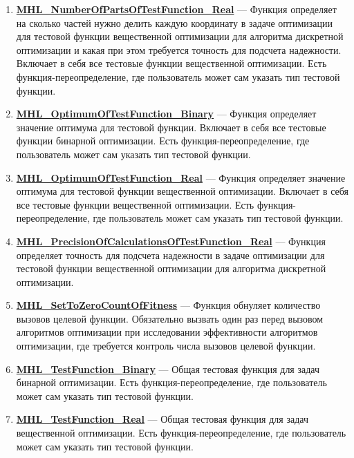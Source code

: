 \documentclass[a4paper,12pt]{article}
\begin{document}
\begin{enumerate}
\item \textbf{\hyperref[MHL_NumberOfPartsOfTestFunction_Real]{MHL\_NumberOfPartsOfTestFunction\_Real}} --- Функция определяет на сколько частей нужно делить каждую координату в задаче оптимизации для тестовой функции вещественной оптимизации для алгоритма дискретной оптимизации и какая при этом требуется точность для подсчета надежности. Включает в себя все тестовые функции вещественной оптимизации. Есть функция-переопределение, где пользователь может сам указать тип тестовой функции.

\item \textbf{\hyperref[MHL_OptimumOfTestFunction_Binary]{MHL\_OptimumOfTestFunction\_Binary}} --- Функция определяет значение оптимума для тестовой функции. Включает в себя все тестовые функции бинарной оптимизации. Есть функция-переопределение, где пользователь может сам указать тип тестовой функции.

\item \textbf{\hyperref[MHL_OptimumOfTestFunction_Real]{MHL\_OptimumOfTestFunction\_Real}} --- Функция определяет значение оптимума для тестовой функции вещественной оптимизации. Включает в себя все тестовые функции вещественной оптимизации. Есть функция-переопределение, где пользователь может сам указать тип тестовой функции.

\item \textbf{\hyperref[MHL_PrecisionOfCalculationsOfTestFunction_Real]{MHL\_PrecisionOfCalculationsOfTestFunction\_Real}} --- Функция определяет точность для подсчета надежности в задаче оптимизации для тестовой функции вещественной оптимизации для алгоритма дискретной оптимизации.

\item \textbf{\hyperref[MHL_SetToZeroCountOfFitness]{MHL\_SetToZeroCountOfFitness}} --- Функция обнуляет количество вызовов целевой функции. Обязательно вызвать один раз перед вызовом алгоритмов оптимизации при исследовании эффективности    алгоритмов оптимизации, где требуется контроль числа вызовов целевой функции.

\item \textbf{\hyperref[MHL_TestFunction_Binary]{MHL\_TestFunction\_Binary}} --- Общая тестовая функция для задач бинарной оптимизации. Есть функция-переопределение, где пользователь может сам указать тип тестовой функции.

\item \textbf{\hyperref[MHL_TestFunction_Real]{MHL\_TestFunction\_Real}} --- Общая тестовая функция для задач вещественной оптимизации. Есть функция-переопределение, где пользователь может сам указать тип тестовой функции.

\end{enumerate}
\end{document}
